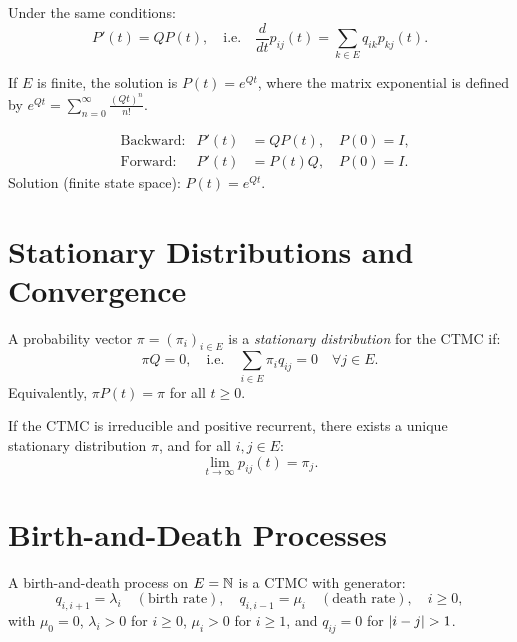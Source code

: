 \begin{theorem}
\label{thm:kolmo_backward}
Under the same conditions:
\[
  P'(t) = Q P(t), \quad \text{i.e.} \quad
  \frac{d}{dt} p_{ij}(t) = \sum_{k \in E} q_{ik} p_{kj}(t).
\]
\end{theorem}

\begin{remark}
If $E$ is finite, the solution is $P(t) = e^{Qt}$, where the matrix exponential
is defined by $e^{Qt} = \sum_{n=0}^{\infty} \frac{(Qt)^n}{n!}$.
\end{remark}

\begin{keyformulas}[title=\textbf{Kolmogorov Equations}]
\begin{align*}
  &\text{Backward:} & P'(t) &= QP(t), \quad P(0) = I, \\
  &\text{Forward:} & P'(t) &= P(t)Q, \quad P(0) = I.
\end{align*}
Solution (finite state space): $P(t) = e^{Qt}$.
\end{keyformulas}

\section{Stationary Distributions and Convergence}

\begin{definition}
A probability vector $\pi = (\pi_i)_{i \in E}$ is a \emph{stationary distribution}
for the CTMC if:
\[
  \pi Q = 0, \quad \text{i.e.} \quad \sum_{i \in E} \pi_i q_{ij} = 0
  \quad \forall j \in E.
\]
Equivalently, $\pi P(t) = \pi$ for all $t \geq 0$.
\end{definition}

\begin{theorem}
\label{thm:convergence_equilibrium}
If the CTMC is irreducible and positive recurrent, there exists a unique
stationary distribution $\pi$, and for all $i, j \in E$:
\[
  \lim_{t \to \infty} p_{ij}(t) = \pi_j.
\]
\end{theorem}

\section{Birth-and-Death Processes}

\begin{definition}
A birth-and-death process on $E = \mathbb{N}$ is a CTMC with generator:
\[
  q_{i,i+1} = \lambda_i \quad (\text{birth rate}), \quad
  q_{i,i-1} = \mu_i \quad (\text{death rate}), \quad i \geq 0,
\]
with $\mu_0 = 0$, $\lambda_i > 0$ for $i \geq 0$, $\mu_i > 0$ for $i \geq 1$,
and $q_{ij} = 0$ for $\left| i - j \right| > 1$.
\end{definition}

